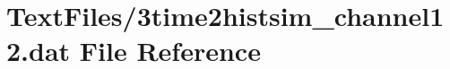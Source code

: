 \hypertarget{3time2histsim__channel12_8dat}{}\section{Text\+Files/3time2histsim\+\_\+channel12.dat File Reference}
\label{3time2histsim__channel12_8dat}
